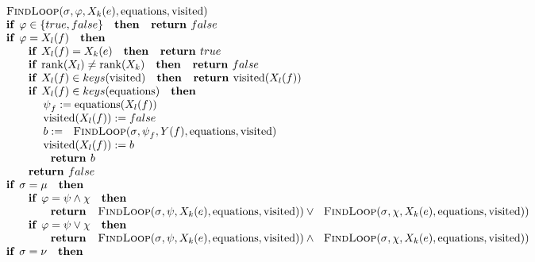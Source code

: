 \begin{equation*}
\begin{array}{l}
\text{\textsc{FindLoop}}(\sigma ,\varphi ,X_{k}(e),\mathrm{equations},%
\mathrm{visited}) \\ 
\text{\textbf{if }}\varphi \in \{true,false\}\text{ \textbf{then }}\text{%
\textbf{return }}false \\ 
\text{\textbf{if }}\varphi =X_{l}(f)\text{ \textbf{then }} \\ 
\qquad \text{\textbf{if }}X_{l}(f)=X_{k}(e)\text{ \textbf{then }}\text{%
\textbf{return }}true \\ 
\qquad \text{\textbf{if }}\mathrm{rank}(X_{l})\neq \mathrm{rank}(X_{k})\text{
\textbf{then }}\text{\textbf{return }}false \\ 
\qquad \text{\textbf{if }}X_{l}(f)\in keys(\mathrm{visited})\text{ \textbf{%
then }}\text{\textbf{return }}\mathrm{visited}(X_{l}(f)) \\ 
\qquad \text{\textbf{if }}X_{l}(f)\in keys(\mathrm{equations})\text{ \textbf{%
then }} \\ 
\qquad \qquad \psi _{f}:=\mathrm{equations}(X_{l}(f)) \\ 
\qquad \qquad \mathrm{visited}(X_{l}(f)):=false \\ 
\qquad \qquad b:=\text{\textsc{FindLoop}}(\sigma ,\psi _{f},Y(f),\mathrm{%
equations},\mathrm{visited}) \\ 
\qquad \qquad \mathrm{visited}(X_{l}(f)):=b \\ 
\qquad \qquad \text{\textbf{return }}b \\ 
\qquad \text{\textbf{return }}false \\ 
\text{\textbf{if }}\sigma =\mu \text{ \textbf{then }} \\ 
\qquad \text{\textbf{if }}\varphi =\psi \wedge \chi \text{ \textbf{then }}
\\ 
\qquad \qquad \text{\textbf{return }}\text{\textsc{FindLoop}}(\sigma ,\psi
,X_{k}(e),\mathrm{equations},\mathrm{visited}))\vee \text{\textsc{FindLoop}}%
(\sigma ,\chi ,X_{k}(e),\mathrm{equations},\mathrm{visited})) \\ 
\qquad \text{\textbf{if }}\varphi =\psi \vee \chi \text{ \textbf{then }} \\ 
\qquad \qquad \text{\textbf{return }}\text{\textsc{FindLoop}}(\sigma ,\psi
,X_{k}(e),\mathrm{equations},\mathrm{visited}))\wedge \text{\textsc{FindLoop}%
}(\sigma ,\chi ,X_{k}(e),\mathrm{equations},\mathrm{visited})) \\ 
\text{\textbf{if }}\sigma =\nu \text{ \textbf{then}} \\ 

\end{array}
\end{equation*}
